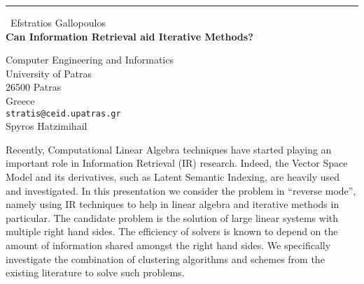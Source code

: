 \documentclass{report}
\begin{document}
\begin{center}
\rule{6in}{1pt} \
{\large Efstratios Gallopoulos \\
{\bf Can Information Retrieval aid Iterative Methods? }}

Computer Engineering and Informatics \\ University of Patras \\ 26500 Patras \\ Greece
\\
{\tt stratis@ceid.upatras.gr}\\
Spyros Hatzimihail\end{center}

Recently, Computational Linear Algebra techniques have started playing an
important role in Information Retrieval (IR) research. Indeed, the Vector
Space Model and its derivatives, such as Latent Semantic Indexing, are
heavily used and investigated. In this presentation we consider the
problem in ``reverse mode'', namely using IR techniques to help in linear
algebra and iterative
methods in particular. The candidate problem is the solution of large
linear systems with multiple right hand sides. The
efficiency of solvers is known to depend on the amount of information
shared amongst the right hand sides.
We specifically investigate the combination of clustering algorithms and
schemes from the existing literature to solve such problems.
\end{document}
